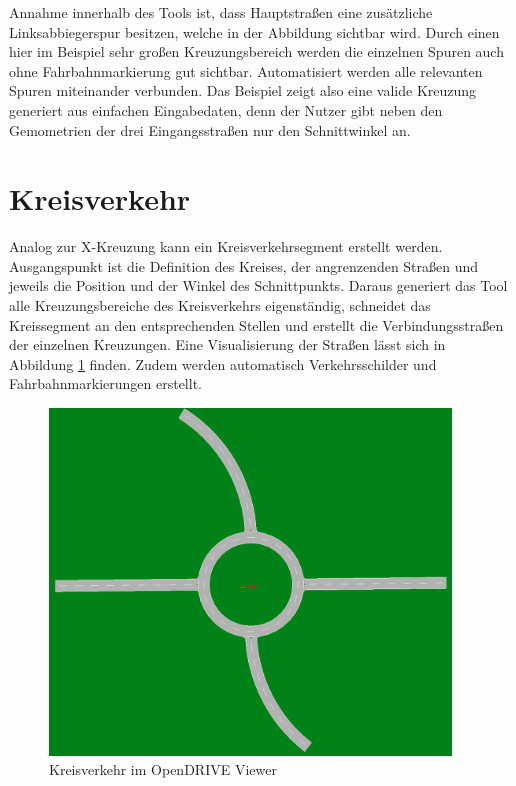 Annahme innerhalb des Tools ist, dass Hauptstraßen eine zusätzliche Linksabbiegerspur besitzen, welche in der Abbildung sichtbar wird. Durch einen hier im Beispiel sehr großen Kreuzungsbereich werden die einzelnen Spuren auch ohne Fahrbahnmarkierung gut sichtbar. Automatisiert werden alle relevanten Spuren miteinander verbunden. Das Beispiel zeigt also eine valide Kreuzung generiert aus einfachen Eingabedaten, denn der Nutzer gibt neben den Gemometrien der drei Eingangsstraßen nur den Schnittwinkel an.

\section{Kreisverkehr}
Analog zur X-Kreuzung kann ein Kreisverkehrsegment erstellt werden. Ausgangspunkt ist die Definition des Kreises, der angrenzenden Straßen und jeweils die Position und der Winkel des Schnittpunkts. Daraus generiert das Tool alle Kreuzungsbereiche des Kreisverkehrs eigenständig, schneidet das Kreissegment an den entsprechenden Stellen und erstellt die Verbindungsstraßen der einzelnen Kreuzungen. Eine Visualisierung der Straßen lässt sich in Abbildung \ref{abb7} finden. Zudem werden automatisch Verkehrsschilder und Fahrbahnmarkierungen erstellt.

\begin{figure}[H]
\flushleft
\includegraphics[width=0.95\textwidth]{fig/fig7.png}
\caption{Kreisverkehr im OpenDRIVE Viewer}
\label{abb7}
\end{figure}

